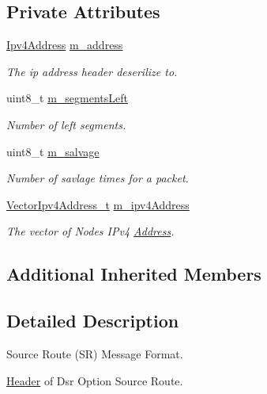 \subsection*{Private Attributes}
\begin{DoxyCompactItemize}
\item 
\hyperlink{classns3_1_1Ipv4Address}{Ipv4\+Address} \hyperlink{classns3_1_1dsr_1_1DsrOptionSRHeader_a52c1fc30837c6518274a5bbd8d9a252b}{m\+\_\+address}
\begin{DoxyCompactList}\small\item\em The ip address header deserilize to. \end{DoxyCompactList}\item 
uint8\+\_\+t \hyperlink{classns3_1_1dsr_1_1DsrOptionSRHeader_a269e71e0fe2de16bcafffec1569b91eb}{m\+\_\+segments\+Left}
\begin{DoxyCompactList}\small\item\em Number of left segments. \end{DoxyCompactList}\item 
uint8\+\_\+t \hyperlink{classns3_1_1dsr_1_1DsrOptionSRHeader_ad9251524491adff7f9f61244adcbe332}{m\+\_\+salvage}
\begin{DoxyCompactList}\small\item\em Number of savlage times for a packet. \end{DoxyCompactList}\item 
\hyperlink{classns3_1_1dsr_1_1DsrOptionSRHeader_aba5fdbda48fa7a2b2d4107bf820ee493}{Vector\+Ipv4\+Address\+\_\+t} \hyperlink{classns3_1_1dsr_1_1DsrOptionSRHeader_a7ae74f398b5a6ba5559532ba3278a7bb}{m\+\_\+ipv4\+Address}
\begin{DoxyCompactList}\small\item\em The vector of Nodes\textquotesingle{} I\+Pv4 \hyperlink{classns3_1_1Address}{Address}. \end{DoxyCompactList}\end{DoxyCompactItemize}
\subsection*{Additional Inherited Members}


\subsection{Detailed Description}
Source Route (SR) Message Format. 

\hyperlink{classns3_1_1Header}{Header} of Dsr Option Source Route.

